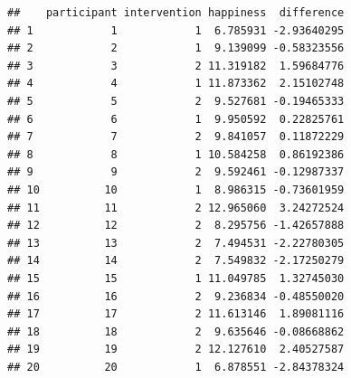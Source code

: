 \documentclass[
]{book}
\newenvironment{Shaded}{\begin{snugshade}}{\end{snugshade}}
\newcommand{\DataTypeTok}[1]{\textcolor[rgb]{0.13,0.29,0.53}{#1}}
\newcommand{\KeywordTok}[1]{\textcolor[rgb]{0.13,0.29,0.53}{\textbf{#1}}}
\newcommand{\NormalTok}[1]{#1}
\newcommand{\OperatorTok}[1]{\textcolor[rgb]{0.81,0.36,0.00}{\textbf{#1}}}
\newcommand{\StringTok}[1]{\textcolor[rgb]{0.31,0.60,0.02}{#1}}
\begin{document}
\begin{Shaded}
\end{Shaded}

\begin{verbatim}
##    participant intervention happiness  difference
## 1            1            1  6.785931 -2.93640295
## 2            2            1  9.139099 -0.58323556
## 3            3            2 11.319182  1.59684776
## 4            4            1 11.873362  2.15102748
## 5            5            2  9.527681 -0.19465333
## 6            6            1  9.950592  0.22825761
## 7            7            2  9.841057  0.11872229
## 8            8            1 10.584258  0.86192386
## 9            9            2  9.592461 -0.12987337
## 10          10            1  8.986315 -0.73601959
## 11          11            2 12.965060  3.24272524
## 12          12            2  8.295756 -1.42657888
## 13          13            2  7.494531 -2.22780305
## 14          14            2  7.549832 -2.17250279
## 15          15            1 11.049785  1.32745030
## 16          16            2  9.236834 -0.48550020
## 17          17            2 11.613146  1.89081116
## 18          18            2  9.635646 -0.08668862
## 19          19            2 12.127610  2.40527587
## 20          20            1  6.878551 -2.84378324
\end{verbatim}

  
\end{document}
